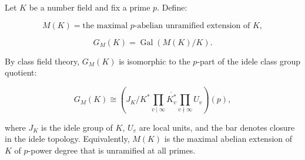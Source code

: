 Let $K$ be a number field and fix a prime $p$. Define:

$$M(K) = \text{the maximal } p\text{-abelian unramified extension of } K,$$

$$G_M(K) = \operatorname{Gal}(M(K) / K).$$

By class field theory, $G_M(K)$ is isomorphic to the $p$-part of the idele class group quotient:

$$G_M(K) \cong \left( J_K / \overline{K^* \prod_{v \mid \infty} K_v^* \prod_{v \nmid \infty} U_v} \right)(p),$$

where $J_K$ is the idele group of $K$, $U_v$ are local units, and the bar denotes closure in the idele topology. Equivalently, $M(K)$ is the maximal abelian extension of $K$ of $p$-power degree that is unramified at all primes.
